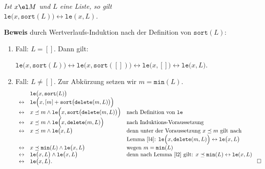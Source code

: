 \begin{Lemma} \label{l6} 
{\em
Ist $x \el M$ und $L$ eine Liste, so gilt \\[0.1cm]
\hspace*{1.3cm}  $\mathtt{le}\bigl(x, \mathtt{sort}(L)\bigr) \leftrightarrow \mathtt{le}(x, L)$.
}
\end{Lemma}
\textbf{Beweis} durch Wertverlaufs-Induktion nach der Definition von $\texttt{sort}(L)$:
\begin{enumerate}
\item Fall: $L = []$. Dann gilt:

      \hspace*{1.3cm} 
      $\mathtt{le}\bigl(x, \mathtt{sort}(L)\bigr) \leftrightarrow \mathtt{le}\bigl(x, \mathtt{sort}([])\bigr) 
         \leftrightarrow \mathtt{le}\bigl(x, []\bigr) \leftrightarrow \mathtt{le}\bigl(x, L\bigr)$.
\item Fall: $L \not= []$.  Zur Abk\"urzung setzen wir $m = \mathtt{min}(L)$.
     \[
     \begin{array}[b]{cll}
                        & \mathtt{le}\bigl(x, \mathtt{sort}(L)\bigr) \\
        \leftrightarrow & \mathtt{le}\Bigl(x, [m] + \mathtt{sort}\bigl(\mathtt{delete}(m, L)\bigr)\Bigr) \\
        \leftrightarrow & x \preceq m \wedge \mathtt{le}\Bigl(x, \mathtt{sort}\bigl(\mathtt{delete}(m,L)\bigr)\Bigr) &
                          \mbox{nach Definition von \texttt{le}} \\
        \leftrightarrow & x \preceq m \wedge \mathtt{le}\Bigl(x, \mathtt{delete}(m,L) \Bigr) &
                          \mbox{nach Induktions-Voraussetzung} \\
        \leftrightarrow & x \preceq m \wedge \mathtt{le}\bigl(x, L \bigr) &
                          \mbox{denn unter der Voraussetzung $x \preceq m$ gilt nach } \\
                        & & \mbox{Lemma \ref{l4}: $\mathtt{le}\Bigl(x, \mathtt{delete}(m,L) \Bigr) \leftrightarrow \mathtt{le}\bigl(x, L \bigr)$} \\
        \leftrightarrow & x \preceq \mathtt{min}(L) \wedge \mathtt{le}\bigl(x, L \bigr) &
                          \mbox{wegen $m = \mathtt{min}(L)$} \\
        \leftrightarrow & \mathtt{le}\bigl(x, L \bigr) \wedge \mathtt{le}\bigl(x, L \bigr) &
                          \mbox{denn nach Lemma \ref{l2} gilt: $x \preceq \mathtt{min}(L) \leftrightarrow \mathtt{le}(x,L)$ } \\
        \leftrightarrow & \mathtt{le}\bigl(x, L \bigr).
     \end{array}\hspace*{\fill} \Box
     \]
\end{enumerate}


